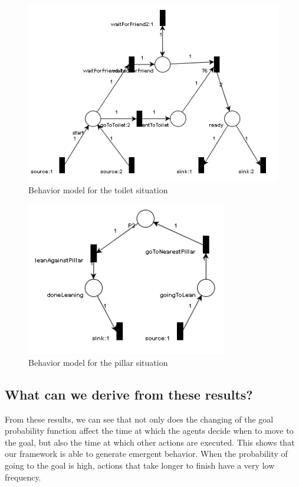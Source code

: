 \documentclass[11pt]{book}
\begin{document}
\begin{figure}
\centering
\includegraphics[width=350pt]{twoPeopleToiletSituation}
\caption{Behavior model for the toilet situation}
\label{toiletsituation}
\end{figure}

\begin{figure}
\centering
\includegraphics[width=250pt]{pillarSituation}
\caption{Behavior model for the pillar situation}
\label{toiletsituation}
\end{figure}



\subsection{What can we derive from these results?}
From these results, we can see that not only does the changing of the goal probability function affect the time at which the agents decide when to move to the goal, but also the time at which other actions are executed. This shows that our framework is able to generate emergent behavior. When the probability of going to the goal is high, actions that take longer to finish have a very low frequency.
\end{document}
